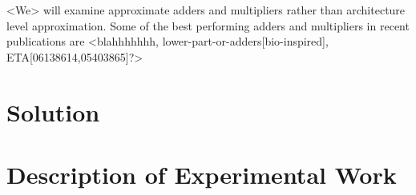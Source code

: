 \documentclass[conference]{IEEEtran}
\begin{document}
<We> will examine approximate adders and multipliers rather than architecture level approximation. Some of the best performing adders and multipliers in recent publications are <blahhhhhhh, lower-part-or-adders[bio-inspired], ETA[06138614,05403865]?> 

\section{Solution}

\section{Description of Experimental Work}

\end{document}
